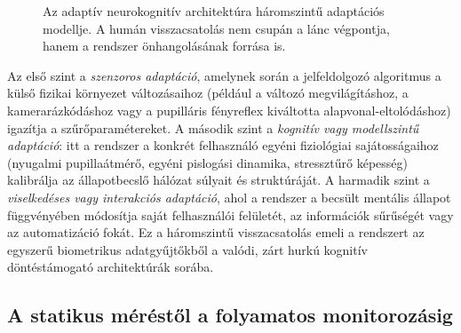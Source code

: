 \documentclass[12pt,a4paper,oneside]{book}
\begin{document}
\begin{figure}[H]
    \centering
    \caption{Az adaptív neurokognitív architektúra háromszintű adaptációs modellje. A humán visszacsatolás nem csupán a lánc végpontja, hanem a rendszer önhangolásának forrása is.}
    \label{fig:three_level_adaptation}
\end{figure}

Az első szint a \emph{szenzoros adaptáció}, amelynek során a jelfeldolgozó algoritmus a külső fizikai környezet változásaihoz (például a változó megvilágításhoz, a kamerarázkódáshoz vagy a pupilláris fényreflex kiváltotta alapvonal-eltolódáshoz) igazítja a szűrőparamétereket. A második szint a \emph{kognitív vagy modellszintű adaptáció}: itt a rendszer a konkrét felhasználó egyéni fiziológiai sajátosságaihoz (nyugalmi pupillaátmérő, egyéni pislogási dinamika, stressztűrő képesség) kalibrálja az állapotbecslő hálózat súlyait és struktúráját. A harmadik szint a \emph{viselkedéses vagy interakciós adaptáció}, ahol a rendszer a becsült mentális állapot függvényében módosítja saját felhasználói felületét, az információk sűrűségét vagy az automatizáció fokát. Ez a háromszintű visszacsatolás emeli a rendszert az egyszerű biometrikus adatgyűjtőkből a valódi, zárt hurkú kognitív döntéstámogató architektúrák sorába.

\subsection{A statikus méréstől a folyamatos monitorozásig}
\end{document}
